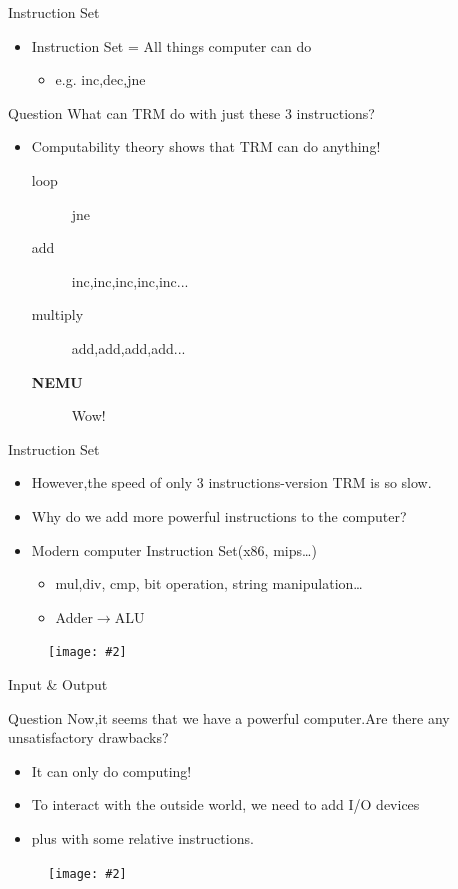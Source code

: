 \documentclass{beamer}
\newcommand{\fignocaption}[2]{
	\begin{figure}[htp]
		\centering
		\texttt{[image: \#2]}
	\end{figure}
}
\begin{document}
\begin{frame}{Instruction Set}
	\begin{itemize}
		\item \alert{Instruction Set = All things computer can do}
		\begin{itemize}
			\item	e.g. inc,dec,jne
		\end{itemize}

\end{itemize}

\begin{block}{Question}
	What can TRM do with just these 3 instructions?
\end{block}
\pause
\begin{itemize}
		\item Computability theory shows that TRM can do anything!
		\begin{description}
			\item [loop]  jne
			\item [add] inc,inc,inc,inc,inc...
			\item [multiply] add,add,add,add...
			\item [\textbf{NEMU}] Wow!
		\end{description}

	\end{itemize}

\end{frame}

\begin{frame}{Instruction Set}
	\begin{itemize}
		\item However,the speed of only 3 instructions-version TRM is so slow.
		\item Why do we add more powerful instructions to the computer?
		\item \alert{Modern computer Instruction Set}(x86, mips…)
		\begin{itemize}
			\item mul,div, cmp, bit operation, string manipulation…
			\item Adder$\longrightarrow$ALU
		\end{itemize}

	\end{itemize}
	\fignocaption{scale=0.4}{modernisa.png}
\end{frame}

\begin{frame}{Input \& Output}
	\begin{block}{Question}
		Now,it seems that we have a powerful computer.Are there any unsatisfactory drawbacks?
	\end{block}
	\begin{itemize}
		\pause
		\item It can only do computing!
		\item To interact with the outside world, \alert{we need to add I/O devices}
		\item plus with some relative instructions.
	\end{itemize}

	\fignocaption{scale=0.4}{io.png}
\end{frame}
\end{document}
